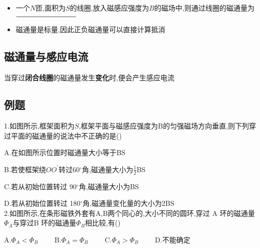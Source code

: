 \documentclass[a4paper,12pt]{book} %
\def \_{$\rule[-6pt]{3cm}{0.05em}$}
\begin{document}
\begin{itemize}
    \item 一个$N$匝,面积为$S$的线圈,放入磁感应强度为$B$的磁场中,则通过线圈的磁通量为\_
    \item 磁通量是标量,因此正负磁通量可以直接计算抵消
    \begin{figure}[htbp]
        \centering
    \end{figure}
\end{itemize}

\subsection{磁通量与感应电流}
当穿过\textbf{闭合线圈}的磁通量发生\textbf{变化}时,便会产生感应电流
\newpage
\subsection{例题}
1.如图所示,框架面积为$S$,框架平面与磁感应强度为B的匀强磁场方向垂直,则下列穿过平面的磁通量的说法中不正确的是()\par
\begin{figure}[htbp]
    \centering
\end{figure}
A.在如图所示位置时磁通量大小等于BS\par
B.若使框架绕$OO^\prime$转过60$^\circ$角,磁通量大小为$\frac{1}{2}$BS\par
C.若从初始位置转过 90$^\circ$角,磁通量大小为BS\par
D.若从初始位置转过 180$^\circ$角,磁通量变化量的大小为2BS\\

2.如图所示,在条形磁铁外套有A,B两个同心的,大小不同的圆环,穿过 A 环的磁通量$\Phi_A$与穿过B 环的磁通量$\Phi_B$相比较,有()\par
A.$\Phi_A < \Phi_B\qquad$
B.$\Phi_A = \Phi_B\qquad$
C.$\Phi_A > \Phi_B\qquad$
D.不能确定\\
\end{document}
